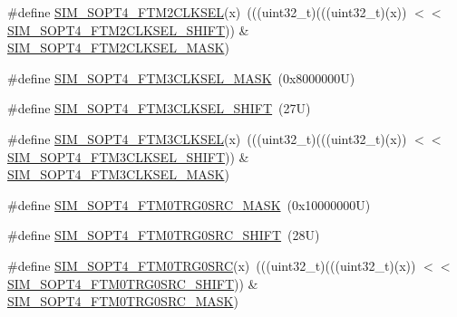 \begin{DoxyCompactItemize}
\#define \mbox{\hyperlink{group___s_i_m___register___masks_ga64bbbd46ffda769f607cd39381a051f1}{S\+I\+M\+\_\+\+S\+O\+P\+T4\+\_\+\+F\+T\+M2\+C\+L\+K\+S\+EL}}(x)~(((uint32\+\_\+t)(((uint32\+\_\+t)(x)) $<$$<$ \mbox{\hyperlink{group___s_i_m___register___masks_ga4b5b8e4dc00734623d8a16db8ff0510c}{S\+I\+M\+\_\+\+S\+O\+P\+T4\+\_\+\+F\+T\+M2\+C\+L\+K\+S\+E\+L\+\_\+\+S\+H\+I\+FT}})) \& \mbox{\hyperlink{group___s_i_m___register___masks_ga8e9ace9af53ead470265ca2338402dae}{S\+I\+M\+\_\+\+S\+O\+P\+T4\+\_\+\+F\+T\+M2\+C\+L\+K\+S\+E\+L\+\_\+\+M\+A\+SK}})
\item 
\#define \mbox{\hyperlink{group___s_i_m___register___masks_gad4d365b5afa43ac25661ec0d06423162}{S\+I\+M\+\_\+\+S\+O\+P\+T4\+\_\+\+F\+T\+M3\+C\+L\+K\+S\+E\+L\+\_\+\+M\+A\+SK}}~(0x8000000\+U)
\item 
\#define \mbox{\hyperlink{group___s_i_m___register___masks_ga54a0762662b5e94c962af29aa373c893}{S\+I\+M\+\_\+\+S\+O\+P\+T4\+\_\+\+F\+T\+M3\+C\+L\+K\+S\+E\+L\+\_\+\+S\+H\+I\+FT}}~(27\+U)
\item 
\#define \mbox{\hyperlink{group___s_i_m___register___masks_gafd31a04f82499ca2b6210c4b2a483ddb}{S\+I\+M\+\_\+\+S\+O\+P\+T4\+\_\+\+F\+T\+M3\+C\+L\+K\+S\+EL}}(x)~(((uint32\+\_\+t)(((uint32\+\_\+t)(x)) $<$$<$ \mbox{\hyperlink{group___s_i_m___register___masks_ga54a0762662b5e94c962af29aa373c893}{S\+I\+M\+\_\+\+S\+O\+P\+T4\+\_\+\+F\+T\+M3\+C\+L\+K\+S\+E\+L\+\_\+\+S\+H\+I\+FT}})) \& \mbox{\hyperlink{group___s_i_m___register___masks_gad4d365b5afa43ac25661ec0d06423162}{S\+I\+M\+\_\+\+S\+O\+P\+T4\+\_\+\+F\+T\+M3\+C\+L\+K\+S\+E\+L\+\_\+\+M\+A\+SK}})
\item 
\#define \mbox{\hyperlink{group___s_i_m___register___masks_ga14159dfb09e3ad4c1b9f2f4950a3f4a6}{S\+I\+M\+\_\+\+S\+O\+P\+T4\+\_\+\+F\+T\+M0\+T\+R\+G0\+S\+R\+C\+\_\+\+M\+A\+SK}}~(0x10000000\+U)
\item 
\#define \mbox{\hyperlink{group___s_i_m___register___masks_ga76c7302a8f939758f0b68fb05ea6dd08}{S\+I\+M\+\_\+\+S\+O\+P\+T4\+\_\+\+F\+T\+M0\+T\+R\+G0\+S\+R\+C\+\_\+\+S\+H\+I\+FT}}~(28\+U)
\item 
\#define \mbox{\hyperlink{group___s_i_m___register___masks_gaa978b16b7f6d6957d5aa9e53e76d0fca}{S\+I\+M\+\_\+\+S\+O\+P\+T4\+\_\+\+F\+T\+M0\+T\+R\+G0\+S\+RC}}(x)~(((uint32\+\_\+t)(((uint32\+\_\+t)(x)) $<$$<$ \mbox{\hyperlink{group___s_i_m___register___masks_ga76c7302a8f939758f0b68fb05ea6dd08}{S\+I\+M\+\_\+\+S\+O\+P\+T4\+\_\+\+F\+T\+M0\+T\+R\+G0\+S\+R\+C\+\_\+\+S\+H\+I\+FT}})) \& \mbox{\hyperlink{group___s_i_m___register___masks_ga14159dfb09e3ad4c1b9f2f4950a3f4a6}{S\+I\+M\+\_\+\+S\+O\+P\+T4\+\_\+\+F\+T\+M0\+T\+R\+G0\+S\+R\+C\+\_\+\+M\+A\+SK}})
$$
\end{DoxyCompactItemize}
